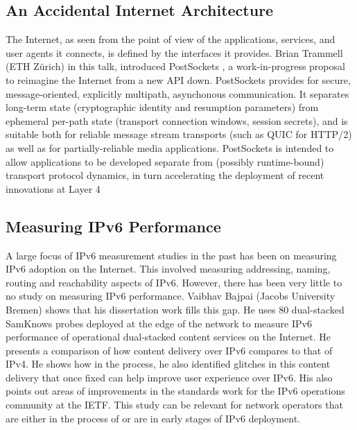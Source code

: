 \subsection{An Accidental Internet Architecture}

The Internet, as seen from the point of view of the applications, services,
and user agents it connects, is defined by the interfaces it provides. Brian
Trammell (ETH Zürich) in this talk, introduced PostSockets
\cite{draft-trammell-post-sockets}, a work-in-progress proposal to reimagine
the Internet from a new API down. PostSockets provides for secure,
message-oriented, explicitly multipath, asynchonous communication.  It
separates long-term state (cryptographic identity and resumption parameters)
from ephemeral per-path state (transport connection windows, session secrets),
and is suitable both for reliable message stream transports (such as QUIC for
HTTP/2) as well as for partially-reliable media applications. PostSockets is
intended to allow applications to be developed separate from (possibly
runtime-bound) transport protocol dynamics, in turn accelerating the
deployment of recent innovations at Layer 4

\subsection{Measuring IPv6 Performance}

A large focus of IPv6 measurement studies in the past has been on measuring
IPv6 adoption on the Internet. This involved measuring addressing, naming,
routing and reachability aspects of IPv6.  However, there has been very little
to no study on measuring IPv6 performance. Vaibhav Bajpai (Jacobs University
Bremen) shows that his dissertation work fills this gap. He uses 80
dual-stacked SamKnows \cite{vbajpai:comst:2015} probes deployed at the edge of
the network to measure IPv6 performance of operational dual-stacked content
services on the Internet.  He presents a comparison of how content delivery
\cite{vbajpai:networking:2015, sahsan:pam:2015} over IPv6 compares to that of
IPv4. He shows how in the process, he also identified glitches in this content
delivery \cite{seravuchira:cnsm:2016} that once fixed can help improve user
experience over IPv6. His also points out areas of improvements
\cite{vbajpai:anrw:2016} in the standards work for the IPv6 operations
community at the IETF. This study can be relevant for network operators that
are either in the process of or are in early stages of IPv6 deployment.


